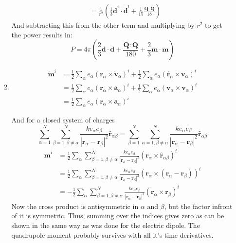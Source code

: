 \documentclass[12pt,a4]{article}
\begin{document}
\begin{enumerate}
\begin{enumerate}
\begin{align*}
                                       &= \frac{1}{r^2}\left(\frac{1}{3}\ddot{\mathbf{d}}^i \cdot \ddot{\mathbf{d}}^l + \frac{1}{15}\frac{\dddot{\mathbf{Q}}:\dddot{\mathbf{Q}}}{18}\right)
        \end{align*}
        And subtracting this from the other term and multiplying by $r^2$ to get the power results in:
        \begin{equation*}
          P = 4\pi \left(\frac{2}{3}\ddot{\mathbf{d}} \cdot \ddot{\mathbf{d}} + \frac{\dddot{\mathbf{Q}}:\dddot{\mathbf{Q}}}{180} + \frac{2}{3}\ddot{\mathbf{ m}}\cdot \ddot{\mathbf{ m}}\right) 
        \end{equation*}

      \item
        \begin{align*}
          \dot{\mathbf{m}}^i &= \frac{1}{2} \sum_\alpha e_\alpha (\mathbf{r}_\alpha \times \dot{\mathbf{v}}_\alpha)^i + \frac{1}{2} \sum_\alpha e_\alpha (\dot{\mathbf{r}_\alpha} \times \mathbf{v}_\alpha)^i\\
                             &= \frac{1}{2} \sum_\alpha e_\alpha (\mathbf{r}_\alpha \times \mathbf{a}_\alpha)^i + \frac{1}{2} \sum_\alpha e_\alpha (\mathbf{v}_\alpha \times \mathbf{v}_\alpha)^i\\
                             &= \frac{1}{2} \sum_\alpha e_\alpha (\mathbf{r}_\alpha \times \mathbf{a}_\alpha)^i 
        \end{align*}

        And for a closed system of charges
            \begin{equation*}
              \sum_{\alpha = 1}^{N} \sum_{\beta = 1, \beta \neq \alpha }^N \frac{k e_\alpha e_\beta }{|\mathbf{r}_\alpha - \mathbf{r}_\beta|^2} \hat{\mathbf{r}}_{\alpha\beta} = \sum_{\beta = 1}^{N} \sum_{\alpha = 1, \beta \neq \alpha }^N \frac{k e_\alpha e_\beta }{|\mathbf{r}_\alpha - \mathbf{r}_\beta|^2} \hat{\mathbf{r}}_{\alpha\beta}
            \end{equation*}
        \begin{align*}
          \dot{\mathbf{m}}^i &= \frac{1}{2} \sum_\alpha \sum_{\beta = 1, \beta \neq \alpha }^N \frac{k e_\alpha e_\beta}{|\mathbf{r}_\alpha - \mathbf{r}_\beta|^2} (\mathbf{r}_\alpha \times \hat{\mathbf{r}}_{\alpha\beta})^i \\
                             &= \frac{1}{2} \sum_\alpha \sum_{\beta = 1, \beta \neq \alpha }^N \frac{k e_\alpha e_\beta}{|\mathbf{r}_\alpha - \mathbf{r}_\beta|^3} (\mathbf{r}_\alpha \times (\mathbf{r}_{\alpha} - \mathbf{r}_{\beta}))^i \\
                             &= -\frac{1}{2} \sum_\alpha \sum_{\beta = 1, \beta \neq \alpha }^N \frac{k e_\alpha e_\beta}{|\mathbf{r}_\alpha - \mathbf{r}_\beta|^3} (\mathbf{r}_\alpha \times \mathbf{r}_{\beta})^i 
        \end{align*}
        Now the cross product is antisymmetric in $\alpha$ and $\beta$, but the factor infront of it is symmetric.
        Thus, summing over the indices gives zero as can be shown in the same way as was done for the electric dipole.
        The quadrupole moment probably survives with all it's time derivatives.


\end{enumerate}
\end{enumerate}
\end{document}
